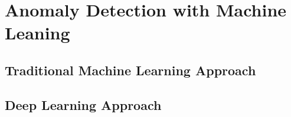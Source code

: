 \documentclass[../Main/thesis.tex]{subfiles}
\begin{document}
\chapter[Anomaly Detection with Machine Leaning]{Anomaly Detection with Machine Leaning}
\section{Traditional Machine Learning Approach}
\section{Deep Learning Approach}
\blankpage
\end{document}
